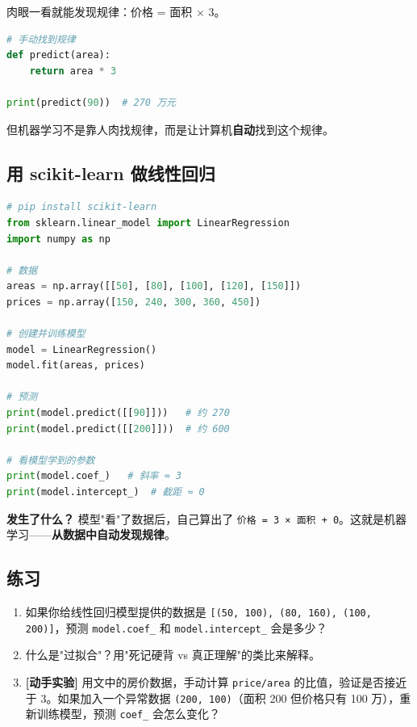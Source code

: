 \documentclass[a4paper,12pt]{ctexart}
\begin{document}
肉眼一看就能发现规律：价格 = 面积 $\times$ 3。

\begin{lstlisting}[language=Python]
# 手动找到规律
def predict(area):
    return area * 3

print(predict(90))  # 270 万元
\end{lstlisting}

但机器学习不是靠人肉找规律，而是让计算机\textbf{自动}找到这个规律。

\subsection*{用 scikit-learn 做线性回归}

\begin{lstlisting}[language=Python]
# pip install scikit-learn
from sklearn.linear_model import LinearRegression
import numpy as np

# 数据
areas = np.array([[50], [80], [100], [120], [150]])
prices = np.array([150, 240, 300, 360, 450])

# 创建并训练模型
model = LinearRegression()
model.fit(areas, prices)

# 预测
print(model.predict([[90]]))   # 约 270
print(model.predict([[200]]))  # 约 600

# 看模型学到的参数
print(model.coef_)   # 斜率 ≈ 3
print(model.intercept_)  # 截距 ≈ 0
\end{lstlisting}

\textbf{发生了什么？} 模型"看"了数据后，自己算出了 \texttt{价格 = 3 × 面积 + 0}。这就是机器学习——\textbf{从数据中自动发现规律}。

\subsection*{练习}

\begin{enumerate}
  \item 如果你给线性回归模型提供的数据是 \texttt{[(50, 100), (80, 160), (100, 200)]}，预测 \texttt{model.coef\_} 和 \texttt{model.intercept\_} 会是多少？
  \item 什么是"过拟合"？用"死记硬背 vs 真正理解"的类比来解释。
  \item \textbf{[动手实验]} 用文中的房价数据，手动计算 \texttt{price/area} 的比值，验证是否接近于 3。如果加入一个异常数据 \texttt{(200, 100)}（面积 200 但价格只有 100 万），重新训练模型，预测 \texttt{coef\_} 会怎么变化？
\end{enumerate}
\end{document}
